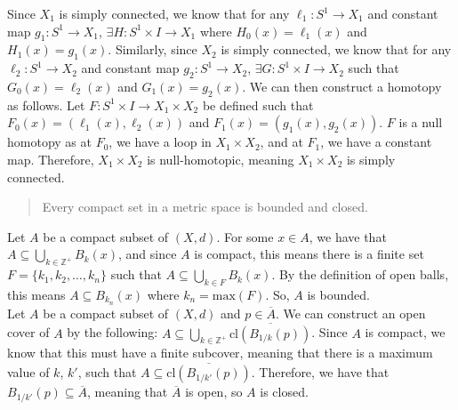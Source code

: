 \documentclass[12pt]{extarticle}
\begin{document}
\noindent Since $X_1$ is simply connected, we know that for any $\ell_1:S^1\rightarrow X_1$ and constant map $g_1:S^1\rightarrow X_1$, $\exists H: S^1\times I\rightarrow X_1$ where $H_0(x) = \ell_1(x)$ and $H_1(x) = g_1(x)$. Similarly, since $X_2$ is simply connected, we know that for any $\ell_2:S^1\rightarrow X_2$ and constant map $g_2:S^1\rightarrow X_2$, $\exists G:S^1\times I\rightarrow X_2$ such that $G_0(x) = \ell_2(x)$ and $G_1(x) = g_2(x)$. We can then construct a homotopy as follows. Let $F:S^1\times I\rightarrow X_1\times X_2$ be defined such that $F_0(x) = (\ell_1(x),\ell_2(x))$ and $F_1(x) = (g_1(x),g_2(x))$. $F$ is a null homotopy as at $F_0$, we have a loop in $X_1\times X_2$, and at $F_1$, we have a constant map. Therefore, $X_1\times X_2$ is null-homotopic, meaning $X_1\times X_2$ is simply connected. 
\pagebreak
  \begin{quote}
    Every compact set in a metric space is bounded and closed.
  \end{quote}
  Let $A$ be a compact subset of $(X,d)$. For some $x\in A$, we have that $A \subseteq \bigcup_{k\in \mathbb{Z}^{+}}B_{k}(x)$, and since $A$ is compact, this means there is a finite set $F = \{k_1,k_2,\dots,k_n\}$ such that $A \subseteq \bigcup_{k\in F}B_{k}(x)$. By the definition of open balls, this means $A\subseteq B_{k_n}(x)$ where $k_n = \textrm{max}(F)$. So, $A$ is bounded.\\

  \noindent Let $A$ be a compact subset of $(X,d)$ and $p\in \overline{A}$. We can construct an open cover of $A$ by the following: $A\subseteq \bigcup_{k\in \mathbb{Z}^+}\overline{\textrm{cl}\left(B_{1/k}(p)\right)}$. Since $A$ is compact, we know that this must have a finite subcover, meaning that there is a maximum value of $k$, $k'$, such that $A \subseteq \overline{\textrm{cl}(B_{1/k'}(p))}$. Therefore, we have that $B_{1/k'}(p)\subseteq \overline{A}$, meaning that $\overline{A}$ is open, so $A$ is closed.
\end{document}
